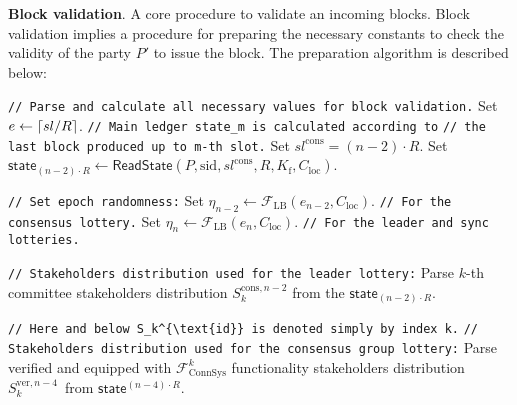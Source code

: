 \textbf{Block validation}.\label{apndx:prepare-block-validation}
A core procedure to validate an incoming blocks.
Block validation implies a procedure for preparing the necessary constants to check the validity of the party $P'$ to issue the block.
The preparation algorithm is described below:
\begin{protocol}
    \caption{$\textsf{PrepareForBlockValidation}(P, \text{sid}, sl, R, l_{\text{VRF}}, K_{\text{f}}, C_{\text{loc}},
    v_{P'}^{\text{vrf}}, S_k^{\text{id}}, f^{\text{lead}}_k, f^{\text{cons}}_k)$}
    \begin{algorithmic}[1]
        \noindent
        \lstinline|// Parse and calculate all necessary values for block validation.|
        \State Set $e \leftarrow \lceil sl/\\R \rceil$.
        \noindent
        \lstinline|// Main ledger state_m is calculated according to|
        \noindent
        \lstinline|// the last block produced up to m-th slot.|
        \State Set $ sl^{\text{cons}} = (n - 2)\cdot R$.
        \State Set $\textsf{state}_{(n - 2)\cdot R} \leftarrow \textsf{ReadState}(P, \text{sid}, sl^{\text{cons}}, R, K_{\text{f}}, C_{\text{loc}})$.

        \noindent
        \lstinline|// Set epoch randomness:|
        \State Set ${\eta_{n-2} \leftarrow \mathcal{F}_{\text{LB}}(e_{n-2}, C_{\text{loc}})}$. \lstinline|// For the consensus lottery.|
        \State Set ${\eta_{n} \leftarrow \mathcal{F}_{\text{LB}}(e_{n}, C_{\text{loc}})}$. \lstinline|// For the leader and sync lotteries.|

        \noindent
        \lstinline|// Stakeholders distribution used for the leader lottery:|
        \State Parse $k$-th committee stakeholders distribution $S_k^{\text{cons}, n - 2}$ from the $\textsf{state}_{(n - 2)\cdot R}$.

        \noindent
        \lstinline|// Here and below S_k^{\text{id}} is denoted simply by index k.|
        \noindent
        \lstinline|// Stakeholders distribution used for the consensus group lottery:|
        \State Parse verified and equipped with $\mathcal{F}^k_{\text{ConnSys}}$ functionality stakeholders distribution $S_k^{\text{ver}, {n - 4}}$\
        from $\textsf{state}^{(n - 4)\cdot R}$.


\end{algorithmic}
\end{protocol}
